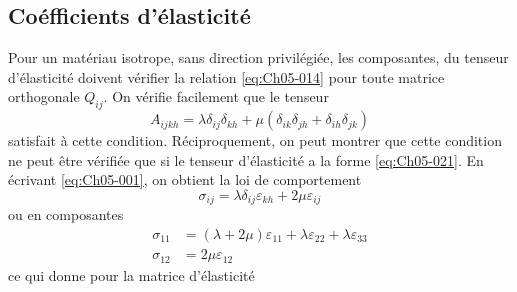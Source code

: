 \subsection{Coéfficients d'élasticité}
Pour un matériau isotrope, sans direction privilégiée, les composantes, du tenseur d'élasticité doivent vérifier la relation \eqref{eq:Ch05-014} pour toute matrice orthogonale $Q_{ij}$.
On vérifie facilement que le tenseur 
\begin{equation}
    A_{ijkh} = \lambda \delta_{ij} \delta_{kh} + \mu \left( \delta_{ik} \delta_{jh} + \delta_{ih} \delta_{jk} \right)
    \label{eq:Ch05-021}
\end{equation}
satisfait à cette condition.
Réciproquement, on peut montrer que cette condition ne peut être vérifiée que si le tenseur d'élasticité a la forme \eqref{eq:Ch05-021}.
En écrivant \eqref{eq:Ch05-001}, on obtient la loi de comportement 
\begin{equation}
    \sigma_{ij} = \lambda \delta_{ij} \varepsilon_{kh} + 2 \mu \varepsilon_{ij}
    \label{eq:Ch05-022}
\end{equation}
ou en composantes 
\begin{equation}
    \begin{aligned}
        \sigma_{11} &= \left( \lambda+ 2 \mu \right) \varepsilon_{11} + \lambda \varepsilon_{22} + \lambda \varepsilon_{33} \\
        \sigma_{12} &= 2\mu \varepsilon_12
    \end{aligned}
    \label{eq:Ch05-023}
\end{equation}
ce qui donne pour la matrice d'élasticité 
